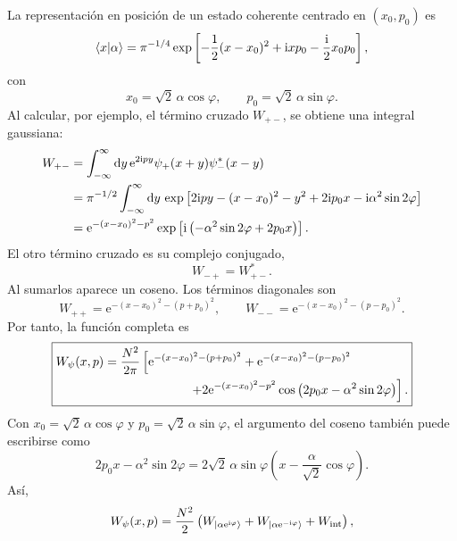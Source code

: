 \documentclass[11pt]{article}
\newcommand{\ii}{\mathrm{i}}
\newcommand{\ee}{\mathrm{e}}
\newcommand{\dd}{\mathrm{d}}
\begin{document}
La representaci\'on en posici\'on de un estado coherente centrado en
$(x_0,p_0)$ es
\begin{equation}
  \braket{x|\alpha}
  =
  \pi^{-1/4}
  \exp\left[
  -\frac12(x-x_0)^2
  +\ii xp_0
  -\frac{\ii}{2}x_0p_0
  \right],
\end{equation}
con
\begin{equation}
  x_0=\sqrt2\,\alpha\cos\varphi,
  \qquad
  p_0=\sqrt2\,\alpha\sin\varphi.
\end{equation}
Al calcular, por ejemplo, el t\'ermino cruzado $W_{+-}$, se obtiene una
integral gaussiana:
\begin{align}
  W_{+-}
  &=
  \int_{-\infty}^{\infty}\dd y\,
  \ee^{2\ii py}\psi_+(x+y)\psi_-^*(x-y) \notag\\
  &=
  \pi^{-1/2}
  \int_{-\infty}^{\infty}\dd y\,
  \exp\left[
  2\ii py
  -(x-x_0)^2-y^2
  +2\ii p_0x
  -\ii\alpha^2\sin2\varphi
  \right] \notag\\
  &=
  \ee^{-(x-x_0)^2-p^2}
  \exp\left[
  \ii\left(-\alpha^2\sin2\varphi+2p_0x\right)
  \right].
\end{align}
El otro t\'ermino cruzado es su complejo conjugado,
\begin{equation}
  W_{-+}=W_{+-}^*.
\end{equation}
Al sumarlos aparece un coseno. Los t\'erminos diagonales son
\begin{equation}
  W_{++}
  =
  \ee^{-(x-x_0)^2-(p+p_0)^2},
  \qquad
  W_{--}
  =
  \ee^{-(x-x_0)^2-(p-p_0)^2}.
\end{equation}
Por tanto, la funci\'on completa es
\begin{equation}
  \boxed{
  \begin{aligned}
  W_\psi(x,p)
  &=
  \frac{N^2}{2\pi}
  \left[
  \ee^{-(x-x_0)^2-(p+p_0)^2}
  +
  \ee^{-(x-x_0)^2-(p-p_0)^2}
  \right.\\
  &\hspace{2.4cm}\left.
  +
  2\ee^{-(x-x_0)^2-p^2}
  \cos\left(2p_0x-\alpha^2\sin2\varphi\right)
  \right].
  \end{aligned}
  }
\end{equation}
Con $x_0=\sqrt2\,\alpha\cos\varphi$ y
$p_0=\sqrt2\,\alpha\sin\varphi$, el argumento del coseno tambi\'en puede
escribirse como
\begin{equation}
  2p_0x-\alpha^2\sin2\varphi
  =
  2\sqrt2\,\alpha\sin\varphi
  \left(
  x-\frac{\alpha}{\sqrt2}\cos\varphi
  \right).
\end{equation}
As\'i,
\begin{equation}
  W_\psi(x,p)
  =
  \frac{N^2}{2}
  \left(
  W_{\ket{\alpha\ee^{\ii\varphi}}}
  +
  W_{\ket{\alpha\ee^{-\ii\varphi}}}
  +
  W_{\mathrm{int}}
  \right),
\end{equation}
\end{document}
